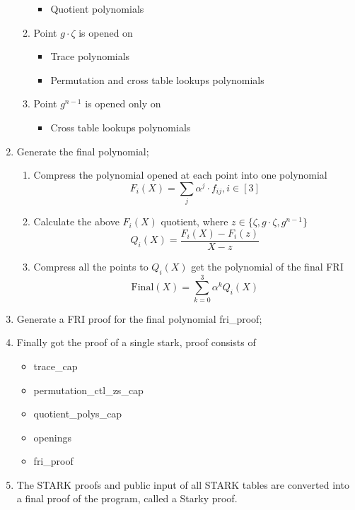 \begin{enumerate}
\begin{enumerate}
\begin{itemize}
                \item Quotient polynomials
            \end{itemize}
        \item Point $g \cdot \zeta$ is opened on
            \begin{itemize}
                \item Trace polynomials
                \item Permutation and cross table lookups polynomials
            \end{itemize}
        \item Point $ g^{n-1} $ is opened only on
            \begin{itemize}
                \item Cross table lookups polynomials
            \end{itemize}
        \end{enumerate}
    \item Generate the final polynomial;
        \begin{enumerate}
            \item Compress the polynomial opened at each point into one polynomial $$ F_i(X) = \sum_{j} \alpha^j \cdot f_{ij}, i \in [3] $$
            \item Calculate the above $ F_i(X) $ quotient, where $ z \in \{ \zeta, g \cdot \zeta, g^{n-1} \} $ $$ Q_i(X) = \frac{F_i(X) - F_i(z)}{X - z} $$
            \item Compress all the points to $ Q_i(X) $ get the polynomial of the final FRI $$ \mathrm{Final}(X) = \sum_{k=0}^3 \alpha^k Q_i(X) $$
        \end{enumerate}
    \item Generate a FRI proof for the final polynomial fri\_proof;
    \item Finally got the proof of a single stark, proof consists of
        \begin{itemize}
            \item trace\_cap
            \item permutation\_ctl\_zs\_cap
            \item quotient\_polys\_cap
            \item openings
            \item fri\_proof
        \end{itemize}
    \item The STARK proofs and public input of all STARK tables are converted into a final proof of the program, called a Starky proof.
\end{enumerate}

